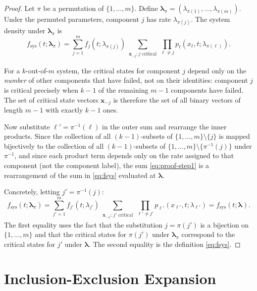 \documentclass[12pt]{article}
\newcommand{\fsys}{f_{\mathrm{sys}}}
\newcommand{\blambda}{\boldsymbol{\lambda}}
\newcommand{\bx}{\mathbf{x}}
\begin{document}
\begin{proof}
Let $\pi$ be a permutation of $\{1, \ldots, m\}$.  Define
$\blambda_\pi = (\lambda_{\pi(1)}, \ldots, \lambda_{\pi(m)})$.  Under
the permuted parameters, component $j$ has rate $\lambda_{\pi(j)}$.
The system density under $\blambda_\pi$ is
\begin{equation}\label{eq:proof-step1}
  \fsys(t; \blambda_\pi) = \sum_{j=1}^{m} f_j(t; \lambda_{\pi(j)})
    \sum_{\substack{\bx_{-j}: j \text{ critical}}}
    \prod_{\ell \neq j} p_\ell(x_\ell, t; \lambda_{\pi(\ell)}).
\end{equation}

For a $k$-out-of-$m$ system, the critical states for component $j$ depend
only on the \emph{number} of other components that have failed, not on
their identities: component $j$ is critical precisely when $k - 1$ of the
remaining $m - 1$ components have failed.  The set of critical state
vectors $\bx_{-j}$ is therefore the set of all binary vectors of length
$m - 1$ with exactly $k - 1$ ones.

Now substitute $\ell' = \pi^{-1}(\ell)$ in the outer sum and rearrange
the inner products.  Since the collection of all $(k-1)$-subsets of
$\{1, \ldots, m\} \setminus \{j\}$ is mapped bijectively to the
collection of all $(k-1)$-subsets of $\{1, \ldots, m\} \setminus
\{\pi^{-1}(j)\}$ under $\pi^{-1}$, and since each product term depends
only on the rate assigned to that component (not the component label),
the sum \eqref{eq:proof-step1} is a rearrangement of the sum in
\eqref{eq:fsys} evaluated at $\blambda$.

Concretely, letting $j' = \pi^{-1}(j)$:
\[
  \fsys(t; \blambda_\pi)
  = \sum_{j'=1}^{m} f_{j'}(t; \lambda_{j'})
    \sum_{\substack{\bx_{-j'}: j' \text{ critical}}}
    \prod_{\ell' \neq j'} p_{\ell'}(x_{\ell'}, t; \lambda_{\ell'})
  = \fsys(t; \blambda).
\]
The first equality uses the fact that the substitution $j = \pi(j')$ is a
bijection on $\{1, \ldots, m\}$ and that the critical states for
$\pi(j')$ under $\blambda_\pi$ correspond to the critical states for
$j'$ under $\blambda$.  The second equality is the definition
\eqref{eq:fsys}.
\end{proof}

\section{Inclusion-Exclusion Expansion}
\label{sec:ie-expansion}
\end{document}

